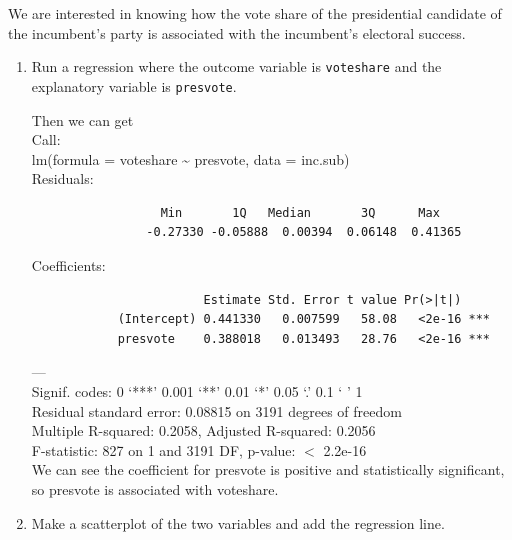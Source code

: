 \documentclass[12pt,letterpaper]{article}
\begin{document}
\noindent We are interested in knowing how the vote share of the presidential candidate of the incumbent's party is associated with the incumbent's electoral success.
	\vspace{.25cm}
	\begin{enumerate}
		\item Run a regression where the outcome variable is \texttt{voteshare} and the explanatory variable is \texttt{presvote}.
			 
			
				Then we can get\\
			
			Call:\\
			lm(formula = voteshare \~{} presvote, data = inc.sub)\\
			
				Residuals:\\
			\begin{verbatim}
				  Min       1Q   Median       3Q      Max 
				-0.27330 -0.05888  0.00394  0.06148  0.41365
			\end{verbatim}
			Coefficients:\\
			\begin{verbatim}
		            	Estimate Std. Error t value Pr(>|t|)    
			(Intercept) 0.441330   0.007599   58.08   <2e-16 ***
			presvote    0.388018   0.013493   28.76   <2e-16 ***
			\end{verbatim}
			---\\
			Signif. codes:  0 ‘***’ 0.001 ‘**’ 0.01 ‘*’ 0.05 ‘.’ 0.1 ‘ ’ 1\\
			
			Residual standard error: 0.08815 on 3191 degrees of freedom\\
			Multiple R-squared:  0.2058,	Adjusted R-squared:  0.2056 \\
			F-statistic:   827 on 1 and 3191 DF,  p-value: $<$ 2.2e-16\\
			
			We can see the coefficient for presvote is positive and statistically significant, so presvote is associated with voteshare.
				
			\vspace{5cm}
			
		\item Make a scatterplot of the two variables and add the regression line. 
			\begin{figure}[H]\centering
			

\end{figure}
\end{enumerate}
\end{document}
